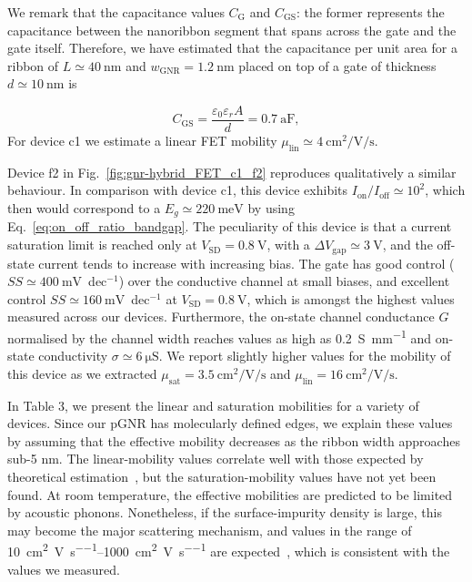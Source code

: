 We remark that the capacitance values $C_\textrm{G}$ and $C_\textrm{GS}$: the former represents the capacitance between the nanoribbon segment that spans across the gate and the gate itself. Therefore, we have estimated that the capacitance per unit area for a ribbon of $L\simeq\SI{40}{\nano\metre}$ and $w_\textrm{GNR}=\SI{1.2}{\nano\metre}$ placed on top of a gate of thickness $d\simeq\SI{10}{\nano\metre}$ is

\begin{equation}
    C_\textrm{GS} = \frac{\varepsilon_0\varepsilon_rA}{d}=\SI{0.7}{\atto\farad},
\end{equation}
%
For device c1 we estimate a linear \gls{FET} mobility $\mu_\textrm{lin}\simeq\SI{4}{\centi\metre\squared\per\volt\per\second}$.

Device f2 in Fig.~\ref{fig:gnr-hybrid_FET_c1_f2} reproduces qualitatively a similar behaviour. In comparison with device c1, this device exhibits $I_\textrm{on}/I_\textrm{off}\simeq 10^2$, which then would correspond to a $E_g\simeq\SI{220}{\milli\electronvolt}$ by using Eq.~\ref{eq:on_off_ratio_bandgap}. The peculiarity of this device is that a current saturation limit is reached only at $V_\textrm{SD}=\SI{0.8}{\volt}$, with a $\Delta V_\textrm{gap}\simeq\SI{3}{\volt}$, and the off-state current tends to increase with increasing bias. The gate has good control ($SS\simeq\SI{400}{\milli\volt}$~dec$^{-1}$) over the conductive channel at small biases, and excellent control $SS\simeq\SI{160}{\milli\volt}$~dec$^{-1}$ at $V_\textrm{SD}=\SI{0.8}{\volt}$, which is amongst the highest values measured across our devices. Furthermore, the on-state channel conductance $G$ normalised by the channel width reaches values as high as \SI{0.2}{\siemens\per\milli\metre} and on-state conductivity $\sigma\simeq\SI{6}{\micro\siemens}$. We report slightly higher values for the mobility of this device as we extracted $\mu_\textrm{sat}=\SI{3.5}{\centi\metre\squared\per\volt\per\second}$ and $\mu_\textrm{lin}=\SI{16}{\centi\metre\squared\per\volt\per\second}$.

In Table 3, we present the linear and saturation mobilities for a variety of devices. Since our pGNR has molecularly defined edges, we explain these values by assuming that the effective mobility decreases as the ribbon width approaches sub-5 nm. The linear-mobility values correlate well with those expected by theoretical estimation~\cite{geng2017graphene}, but the saturation-mobility values have not yet been found. At room temperature, the effective mobilities are predicted to be limited by acoustic phonons. Nonetheless, if the surface-impurity density is large, this may become the major scattering mechanism, and values in the range of \SIrange{10}{1000}{\centi\metre\squared\per\volt\per\second} are expected~\cite{fang2008mobility}, which is consistent with the values we measured.


